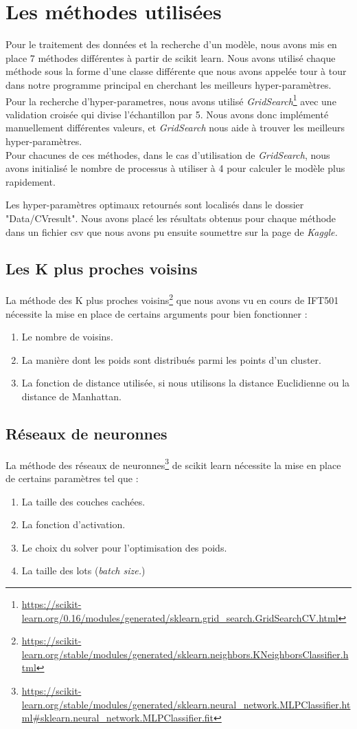 \documentclass[12pt]{article}
\begin{document}
\section{Les méthodes utilisées\label{methodes}}
Pour le traitement des données et la recherche d'un modèle, nous avons mis en place 7 méthodes différentes à partir de scikit learn. Nous avons utilisé chaque méthode sous la forme d'une classe différente que nous avons appelée tour à tour dans notre programme principal en cherchant les meilleurs hyper-paramètres. Pour la recherche d'hyper-parametres, nous avons utilisé \textit{GridSearch}\footnote{\url{https://scikit-learn.org/0.16/modules/generated/sklearn.grid_search.GridSearchCV.html}} avec une validation croisée qui divise l'échantillon par 5. Nous avons donc implémenté manuellement différentes valeurs, et \textit{GridSearch} nous aide à trouver les meilleurs hyper-paramètres. \\ Pour chacunes de ces méthodes, dans le cas d'utilisation de \textit{GridSearch}, nous avons initialisé le nombre de processus à utiliser à 4 pour calculer le modèle plus rapidement. 

Les hyper-paramètres optimaux retournés sont localisés dans le dossier "Data/CVresult". Nous avons placé les résultats obtenus pour chaque méthode dans un fichier csv que nous avons pu ensuite soumettre sur la page de \textit{Kaggle.} 

\subsection{Les K plus proches voisins}
La méthode des K plus proches voisins\footnote{\url{https://scikit-learn.org/stable/modules/generated/sklearn.neighbors.KNeighborsClassifier.html}} que nous avons vu en cours de IFT501 nécessite la mise en place de certains arguments pour bien fonctionner : \begin{enumerate}
\item Le nombre de voisins.
\item La manière dont les poids sont distribués parmi les points d'un cluster.
\item La fonction de distance utilisée, si nous utilisons la distance Euclidienne ou la distance de Manhattan.
\end{enumerate}


\subsection{Réseaux de neuronnes}
La méthode des réseaux de neuronnes\footnote{\url{https://scikit-learn.org/stable/modules/generated/sklearn.neural_network.MLPClassifier.html\#sklearn.neural_network.MLPClassifier.fit}} de scikit learn nécessite la mise en place de certains paramètres tel que :
\begin{enumerate}
\item La taille des couches cachées.
\item La fonction d'activation.
\item Le choix du solver pour l'optimisation des poids.
\item La taille des lots (\textit{batch size.}) 
\end{enumerate}
\end{document}
